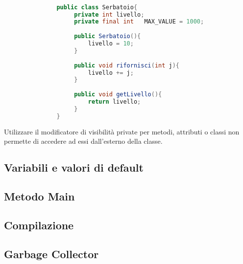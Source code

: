 \documentclass{subfiles}
\begin{document}
    \begin{Example*}
        \begin{center}
           \begin{lstlisting}[language = java]

               public class Serbatoio{
                    private int livello;
                    private final int   MAX_VALUE = 1000;
                
                    public Serbatoio(){
                        livello = 10;    
                    }
                    
                    public void rifornisci(int j){
                        livello += j;   
                    }
                    
                    public void getLivello(){
                        return livello;   
                    }
               }
           \end{lstlisting}
        \end{center}
   \end{Example*}
    
   \begin{Note*}
    Utilizzare il modificatore di visibilità private per metodi, attributi o classi non permette di accedere ad essi 
    dall'esterno della classe.
   \end{Note*}

   

   \subsection{Variabili e valori di default}
   

   \subsection{Metodo Main}
   

   \subsection{Compilazione}
   

   \subsection{Garbage Collector}
   
\end{document}
